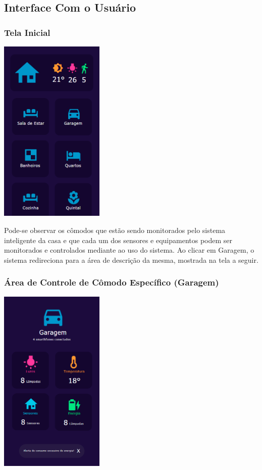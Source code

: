 \subsection{Interface Com o Usuário}

\subsubsection{Tela Inicial}

\begin{center}
\includegraphics[width=5cm]{figuras/2}
\end{center}

\par Pode-se observar os cômodos que estão sendo monitorados pelo sistema inteligente da casa e que cada um dos sensores e equipamentos podem ser monitorados e controlados mediante ao uso do sistema. Ao clicar em Garagem, o sistema redireciona para a área de descrição da mesma, mostrada na tela a seguir.

\subsubsection{Área de Controle de Cômodo Específico (Garagem)}

\begin{center}
\includegraphics[width=5cm]{figuras/3}
\end{center}

